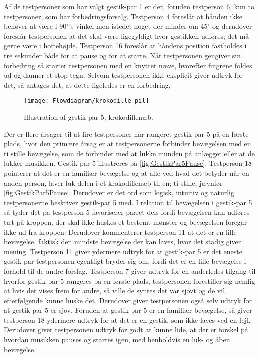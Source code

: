 Af de testpersoner som har valgt gestik-par 1 er der, foruden testperson 6, kun to testpersoner, som har forbedringsforsalg. Testperson 4 foreslår at hånden ikke behøver at være i 90$^{\circ}$'s vinkel men istedet noget der minder om 45$^{\circ}$ og derudover foreslår testpersonen at det skal være ligegyldigt hvor gestikken udføres; det må gerne være i hoftehøjde. Testperson 16 foreslår at håndens position fastholdes i tre sekunder både for at pause og for at starte. Når testpersonen gengiver sin forbedring så starter testpersonen med en knyttet næve, hvorefter fingrene foldes ud og danner et stop-tegn. Selvom testpersonen ikke eksplicit giver udtryk for det, så antages det, at dette ligeledes er en forbedring.
%
\begin{figure}[H]
	\centering
	\texttt{[image: Flowdiagram/krokodille-pil]}
	\caption{Illustration af gestik-par 5; krokodillenæb.}
	\label{fig:GestikPar5Pause}
\end{figure}
\noindent
%
Der er flere årsager til at fire testpersoner har rangeret gestik-par 5 på en første plads, hvor den primære årsag er at testpersonerne forbinder bevægelsen med en ti stille bevægelse, som de forbinder med at lukke munden på anlægget eller at de lukker musikken. Gestik-par 5 illustreres på \autoref{fig:GestikPar5Pause}. Testperson 18 pointerer at det er en familiær bevægelse og at alle ved hvad det betyder når en anden person, laver luk-delen i et krokodillenæb til en; ti stille, jævnfør \autoref{fig:GestikPar5Pause}. Derudover er det ord som logisk, intuitiv og naturlig testpersonerne beskriver gestik-par 5 med. I relation til bevægelsen i gestik-par 5 så tyder det på testperson 5 favoriserer parret dels fordi bevægelsen kan udføres tæt på kroppen, der skal ikke huskes et bestemt mønster og bevægelsen foregår ikke ud fra kroppen. Derudover kommenterer testperson 11 at det er en lille bevægelse, faktisk den mindste bevægelse der kan laves, hvor det stadig giver mening. Testperson 11 giver ydermere udtryk for at gestik-par 5 er det eneste gestik-par testpersonen egentligt bryder sig om, fordi det er en lille bevægelse i forhold til de andre forslag. Testperson 7 giver udtryk for en anderledes tilgang til hvorfor gestik-par 5 rangeres på en første plads, testpersonen forestiller sig nemlig at hvis det vises frem for andre, så ville de syntes det var sjovt og de vil efterfølgende kunne huske det. Derudover giver testpersonen også selv udtryk for at gestik-par 5 er sjov. Foruden at gestik-par 5 er en familiær bevægelse, så giver testperson 18 ydermere udtryk for at det er en gestik, som ikke laves ved en fejl. Derudover giver testpersonen udtryk for godt at kunne lide, at der er forskel på hvordan musikken pauses og startes igen, med henholdvis en luk- og åben bevægelse. 

